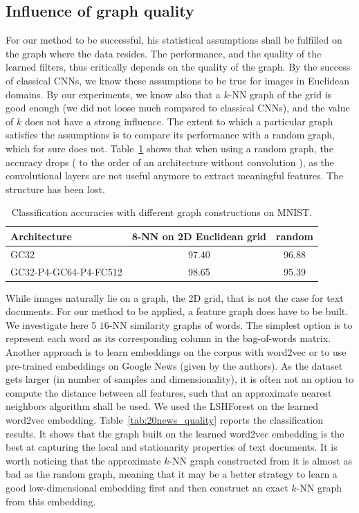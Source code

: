\documentclass{article}
\newcommand{\tabref}[1]{Table~\ref{tab:#1}}
\newcommand{\todo}[1]{{\color{red} #1 }}
\begin{document}
\subsection{Influence of graph quality} \label{sec:graph_quality}

For our method to be successful, his statistical assumptions shall be fulfilled
on the graph where the data resides. The performance, and the quality of the
learned filters, thus critically depends on the quality of the graph. By the
success of classical CNNs, we know these assumptions to be true for images in
Euclidean domains. By our experiments, we know also that a $k$-NN graph of the
grid is good enough (we did not loose much compared to classical CNNs), and the
value of $k$ does not have a strong influence. The extent to which a particular
graph satisfies the assumptions is to compare its performance with a random
graph, which for sure does not. \tabref{mnist_quality} shows that when using a
random graph, the accuracy drops (\todo{to the order of an architecture without
convolution}), as the convolutional layers are not useful anymore to extract
meaningful features. The structure has been lost.

\begin{table}[h!]
\centering
\begin{tabular}{lcc} \toprule
Architecture & 8-NN on 2D Euclidean grid & random \\
\midrule
GC32 & 97.40 & 96.88 \\
GC32-P4-GC64-P4-FC512 & 98.65 & 95.39 \\
\bottomrule \end{tabular}
\caption{Classification accuracies with different graph constructions on MNIST.} 
\label{tab:mnist_quality}
\end{table}

While images naturally lie on a graph, the 2D grid, that is not the case for
text documents. For our method to be applied, a feature graph does have to be
built.
We investigate here 5 $16$-NN similarity graphs of words. The simplest option is
to represent each word as its corresponding column in the bag-of-words matrix.
Another approach is to learn embeddings on the corpus with word2vec
\cite{pro:MikolovChenCorradoDean13word2vec} or to use pre-trained embeddings on
Google News (given by the authors). As the dataset gets larger (in number of
samples and dimensionality), it is often not an option to compute the distance
between all features, such that an approximate nearest neighbors algorithm shall
be used. We used the LSHForest \cite{pro:BawaCondieGanesan05LSHForest} on the
learned word2vec embedding. \tabref{20news_quality} reports the classification
results. It shows that the graph built on the learned word2vec embedding is the
best at capturing the local and stationarity properties of text documents. It is
worth noticing that the approximate $k$-NN graph constructed from it is almost
as bad as the random graph, meaning that it may be a better strategy to learn a
good low-dimensional embedding first and then construct an exact $k$-NN graph
from this embedding.
\end{document}
